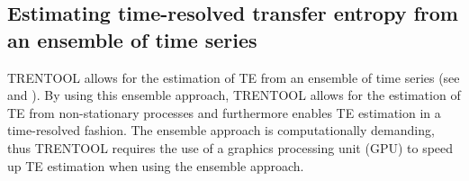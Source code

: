 \documentclass[a4paper,10pt]{article}
\begin{document}
% 
% 
% 
% 


\subsection{Estimating time-resolved transfer entropy from an ensemble of time series}\label{sec:ensemble_method}

TRENTOOL allows for the estimation of TE from an ensemble of time series (see \cite{wollstadt2013} and \cite{gomez-herrero2010}). By using this ensemble approach, TRENTOOL allows for the estimation of TE from non-stationary processes and furthermore enables TE estimation in a time-resolved fashion. The ensemble approach is computationally demanding, thus TRENTOOL requires the use of a graphics processing unit (GPU) to speed up TE estimation when using the ensemble approach. 
\end{document}
